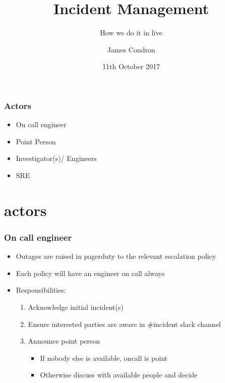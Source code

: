 \documentclass[]{beamer}
\title[incidents]{Incident Management}
\subtitle{How we do it in live}
\author[jspc]{James Condron}
\institute[Beamly]{
  Beamly \\
  Site Reliability Team
}
\date{11th October 2017}
\begin{document}
\begin{frame}
  \titlepage
\end{frame}

\begin{frame}
  \frametitle{Actors}

  \begin{itemize}[<+->]
  \item On call engineer
  \item Point Person
  \item Investigator(s)/ Engineers
  \item SRE
  \end{itemize}

\end{frame}

\section{actors}
\begin{frame}
  \frametitle{On call engineer}

  \begin{itemize}[<+->]
  \item Outages are raised in pagerduty to the relevant escalation policy
  \item Each policy will have an engineer on call always
  \item Responsibilities:

    \begin{enumerate}
    \item Acknowledge initial incident(s)
    \item Ensure interested parties are aware in #incident slack channel
    \item Announce point person

      \begin{itemize}
      \item If nobody else is available, oncall is point
      \item Otherwise discuss with available people and decide
      \end{itemize}

    \end{enumerate}

  \end{itemize}

\end{frame}
\end{document}
